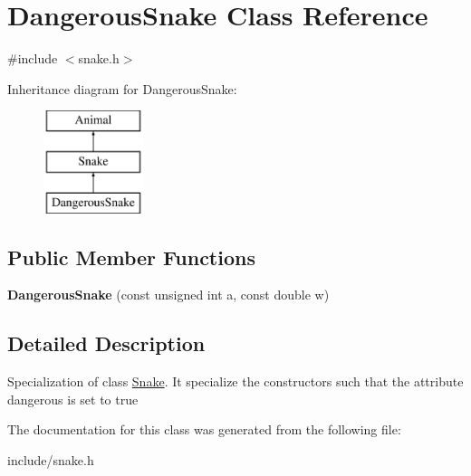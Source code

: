 \hypertarget{classDangerousSnake}{}\section{Dangerous\+Snake Class Reference}
\label{classDangerousSnake}


{\ttfamily \#include $<$snake.\+h$>$}

Inheritance diagram for Dangerous\+Snake\+:\begin{figure}[H]
\begin{center}
\leavevmode
\includegraphics[height=3.000000cm]{classDangerousSnake}
\end{center}
\end{figure}
\subsection*{Public Member Functions}
\begin{DoxyCompactItemize}
\item 
\mbox{\label{classDangerousSnake_affea07d2d8e6bcb61ee192cca2a05838}} 
{\bfseries Dangerous\+Snake} (const unsigned int a, const double w)
\end{DoxyCompactItemize}


\subsection{Detailed Description}
Specialization of class \hyperlink{classSnake}{Snake}. It specialize the constructors such that the attribute {\ttfamily dangerous} is set to true 

The documentation for this class was generated from the following file\+:\begin{DoxyCompactItemize}
\item 
include/snake.\+h\end{DoxyCompactItemize}
